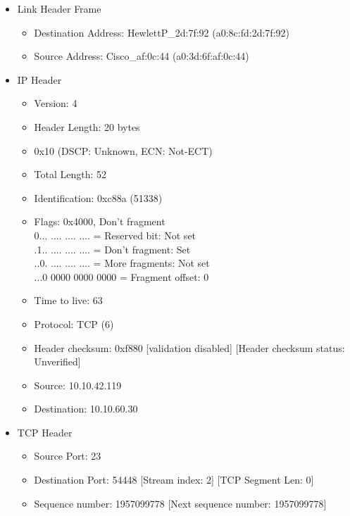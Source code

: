 \documentclass[14pt]{extarticle}
\begin{document}
    \begin{itemize}
        \item \textsf{Link Header Frame}
            \begin{itemize}
                \item Destination Address: HewlettP\_2d:7f:92 (a0:8c:fd:2d:7f:92)
                \item Source Address: Cisco\_af:0c:44 (a0:3d:6f:af:0c:44)
            \end{itemize}
        
        \item \textsf{IP Header} 
            \begin{itemize}
            \item Version: 4
            \item Header Length: 20 bytes
            \item 0x10 (DSCP: Unknown, ECN: Not-ECT)
            \item Total Length: 52
            \item Identification: 0xc88a (51338)
            \item Flags: 0x4000, Don't fragment \\
                0... .... .... .... = Reserved bit: Not set\\       
                .1.. .... .... .... = Don't fragment: Set\\        
                ..0. .... .... .... = More fragments: Not set\\        
                ...0 0000 0000 0000 = Fragment offset: 0\\    
            \item Time to live: 63    
            \item Protocol: TCP (6)    
            \item Header checksum: 0xf880 [validation disabled]    [Header checksum status: Unverified]    
            \item Source: 10.10.42.119    
            \item Destination: 10.10.60.30
        \end{itemize}
        \item \textsf{TCP Header}
            \begin{itemize}
                \item Source Port: 23    
                \item Destination Port: 54448    {[Stream index: 2]}    {[TCP Segment Len: 0]}    
                \item Sequence number: 1957099778    {[Next sequence number: 1957099778]}    

\end{itemize}
\end{itemize}
\end{document}

